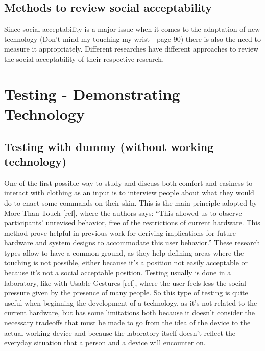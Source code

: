 \documentclass{sigchi}
\begin{document}
\subsection{Methods to review social acceptability}
%

Since social acceptability is a major issue when it comes to the adaptation of new technology (Don’t mind my touching my wrist - page 90) there is also the need to measure it appropriately. Different researches have different approaches to review the social acceptability of their respective research.
\section{Testing - Demonstrating Technology}

\subsection{Testing with dummy (without working technology)}
One of the first possible way to study and discuss both comfort and easiness  to interact with clothing as an input is to interview people about what they would do to enact some commands on their skin. This is the main principle adopted by More Than Touch [ref], where the authors says: “This allowed us to observe participants’ unrevised behavior, free of the restrictions of current hardware. This method prove helpful in previous work for deriving implications for future hardware and system designs to accommodate this user behavior.”
These research types allow to have a common ground, as they help defining areas where the touching is not possible, either because it’s a position not easily acceptable or because it’s not a social acceptable position. Testing usually is done in a laboratory, like with Usable Gestures [ref], where the user feels less the social pressure given by the presence of many people. So this type of testing is quite useful when beginning the development of a technology, as it’s not related to the current hardware, but has some limitations both because it doesn’t consider the necessary tradeoffs that must be made to go from the idea of the device to the actual working device and because the laboratory itself doesn’t reflect the everyday situation that a person and a device will encounter on.
\end{document}

